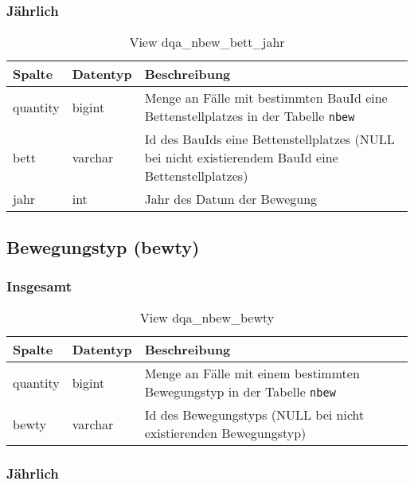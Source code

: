 \subsubsection{Jährlich} \label{subsubsec:bettJ}

\begin{table}[ht]
	\centering   
	\caption{View dqa\_nbew\_bett\_jahr}
	\label{tab:beweBettJahr}
	\begin{tabular}{||l|l|p{10cm}||}   		
		\hline
		Spalte & Datentyp & Beschreibung \\ [0.5ex]
		\hline\hline
		quantity & bigint & Menge an Fälle mit bestimmten BauId eine Bettenstellplatzes in der Tabelle \texttt{nbew} \\
		\hline
		bett & varchar &  Id des BauIds eine Bettenstellplatzes (NULL bei nicht existierendem BauId eine Bettenstellplatzes) \\
		\hline
		jahr & int &  Jahr des Datum der Bewegung \\
		\hline		
	\end{tabular}
\end{table}

\subsection{Bewegungstyp (bewty)} \label{subsec:bewtyp}

\subsubsection{Insgesamt} \label{subsubsec:bewtypI}

\begin{table}[ht]
	\centering   
	\caption{View dqa\_nbew\_bewty}
	\label{tab:bewBtyI}
	\begin{tabular}{||l|l|p{10cm}||}   		
		\hline
		Spalte & Datentyp & Beschreibung \\ [0.5ex]
		\hline\hline
		quantity & bigint & Menge an Fälle mit einem bestimmten Bewegungstyp in der Tabelle \texttt{nbew} \\
		\hline
		bewty & varchar & Id des Bewegungstyps (NULL bei nicht existierenden Bewegungstyp)\\
		\hline
		
	\end{tabular}
\end{table}

\newpage

\subsubsection{Jährlich} \label{subsubsec:bewtypJ}

